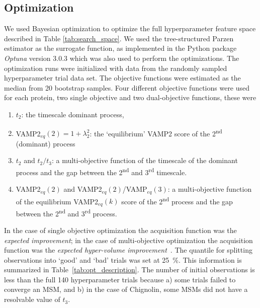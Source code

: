 \documentclass[journal=jacsat,manuscript=article]{achemso}
\begin{document}
\subsection{Optimization}

We used Bayesian optimization to optimize the full hyperparameter feature space described in Table \ref{tab:search_space}. We used the tree-structured Parzen estimator as the surrogate function, as implemented in the Python package \textit{Optuna} version 3.0.3 \cite{akiba_optuna_2019} which was also used to perform the optimizations. The optimization runs were initialized with data from the randomly sampled hyperparameter trial data set. The objective functions were estimated as the median from 20 bootstrap samples. Four different objective functions were used for each protein, two single objective and two dual-objective functions, these were 
\begin{enumerate}
    \item $t_2$: the timescale dominant process, 
    \item VAMP2$_{eq}(2) = 1+\lambda_{2}^{2}$: the `equilibrium' VAMP2 score of the 2\textsuperscript{nd} (dominant) process
    \item $t_2$ and $t_{2}/t_{3}$: a multi-objective function of the timescale of the dominant process and the gap between the 2\textsuperscript{nd} and 3\textsuperscript{rd} timescale. 
    \item VAMP2$_{eq}(2)$ and VAMP2$_{eq}(2)$/VAMP$_{eq}(3)$: a multi-objective function of the equilibrium VAMP2$_{eq}(k)$ score of the 2\textsuperscript{nd} process and the gap between the 2\textsuperscript{nd} and 3\textsuperscript{rd} process. 
\end{enumerate}

In the case of single objective optimization the acquisition function was the \emph{expected improvement}; in the case of multi-objective optimization the acquisition function was the \emph{expected hyper-volume improvement}~\cite{ozaki_multitpe_2022}. The quantile for splitting observations into `good' and `bad' trials was set at \SI{25}{\percent}. This information is summarized in Table~\ref{tab:opt_description}. The number of initial observations is less than the full \num{140} hyperparameter trials because a) some trials failed to converge an MSM, and b) in the case of Chignolin, some MSMs did not have a resolvable value of $t_3$.  
\end{document}
